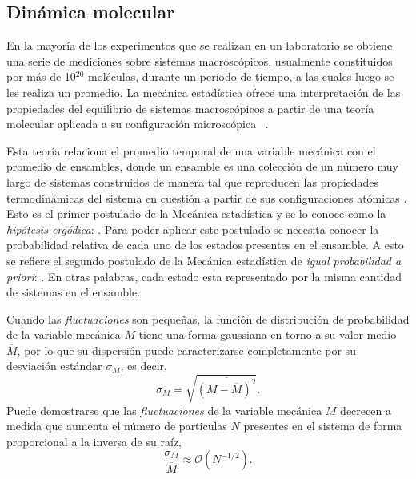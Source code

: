 \subsection{Dinámica molecular}

En la mayoría de los experimentos que se realizan en un laboratorio se obtiene 
una serie de mediciones sobre sistemas macroscópicos, usualmente constituidos por 
más de 10$^{20}$ moléculas, durante un período de tiempo, a las cuales luego se 
les realiza un promedio. La mecánica estadística ofrece una interpretación de 
las propiedades del equilibrio de sistemas macroscópicos a partir de una teoría 
molecular aplicada a su configuración microscópica ~\cite{hill1986}.

Esta teoría relaciona el promedio temporal de una variable mecánica con el 
promedio de ensambles, donde un ensamble es una colección de un número muy largo
de sistemas construidos de manera tal que reproducen las propiedades 
termodinámicas del sistema en cuestión a partir de sus configuraciones atómicas
\cite{salinas2001}. Esto es el primer postulado de la Mecánica estadística y se 
lo conoce como la \textit{hipótesis ergódica}: . Para poder aplicar
este postulado se necesita conocer la probabilidad relativa de cada uno de los 
estados presentes en el ensamble. A esto se refiere el segundo postulado de la 
Mecánica estadística de \textit{igual probabilidad a priori}: . En otras palabras, cada 
estado esta representado por la misma cantidad de sistemas en el ensamble.

Cuando las \textit{fluctuaciones} son pequeñas, la función de distribución de 
probabilidad de la variable mecánica $M$ tiene una forma gaussiana en torno a su 
valor medio $\overline{M}$, por lo que su dispersión puede caracterizarse 
completamente por su desviación estándar $\sigma_M$, es decir,
\begin{equation}
    \sigma_M = \sqrt{\overline{(M - \overline{M})^2}}.
\end{equation}
Puede demostrarse que las \textit{fluctuaciones} de la variable mecánica $M$ 
decrecen a medida que aumenta el número de particulas $N$ presentes en el sistema 
de forma proporcional a la inversa de su raíz,
\begin{equation}\label{eq:fluctuaciones}
    \frac{\sigma_M}{\overline{M}} \approx \mathcal{O}(N^{-1/2}).
\end{equation}

